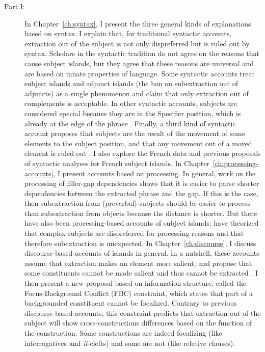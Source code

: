 \begin{description}
\item[Part I:] In Chapter~\ref{ch:syntax}, I present the three general kinds of explanations based on syntax. I explain that, for traditional syntactic accounts, extraction out of the subject is not only dispreferred but is ruled out by syntax. Scholars in the syntactic tradition do not agree on the reasons that cause subject islands, but they agree that these reasons are universal and are based on innate properties of language. Some syntactic accounts treat subject islands and adjunct islands (the ban on subextraction out of adjuncts) as a single phenomenon \citep[e.g.][]{Huang.1982} and claim that only extraction out of complements is acceptable. In other syntactic accounts, subjects are considered special because they are in the Specifier position, which is already at the edge of the phrase \citep[e.g.][]{Chomsky.2008}. Finally, a third kind of syntactic account proposes that subjects are the result of the movement of some elements to the subject position, and that any movement out of a moved element is ruled out \citep[e.g.][]{Uriagereka.2012}. I also explore the French data and previous proposals of syntactic analyses for French subject islands.  In Chapter~\ref{ch:processing-accounts}, I present accounts based on processing. In general, work on the processing of filler-gap dependencies shows that it is easier to parse shorter dependencies between the extracted phrase and the gap. If this is the case, then subextraction from (preverbal) subjects should be easier to process than subextraction from objects because the distance is shorter. But there have also been processing-based accounts of subject islands: \citet{Kluender.2004} have theorized that complex subjects are dispreferred for processing reasons and that therefore subextraction is unexpected. In Chapter~\ref{ch:discourse}, I discuss discourse-based accounts of islands in general. In a nutshell, these accounts assume that extraction makes an element more salient, and propose that some constituents cannot be made salient and thus cannot be extracted \citep[e.g.][]{Erteschik-Shir.1973}. I then present a new proposal based on information structure, called the Focus-Background Conflict (FBC) constraint, which states that part of a backgrounded constituent cannot be focalized. Contrary to previous discourse-based accounts, this constraint predicts that extraction out of the subject will show cross-constructions differences based on the function of the construction. Some constructions are indeed focalizing (like interrogatives and \emph{it}-clefts) and some are not (like relative clauses). 


\end{description}
